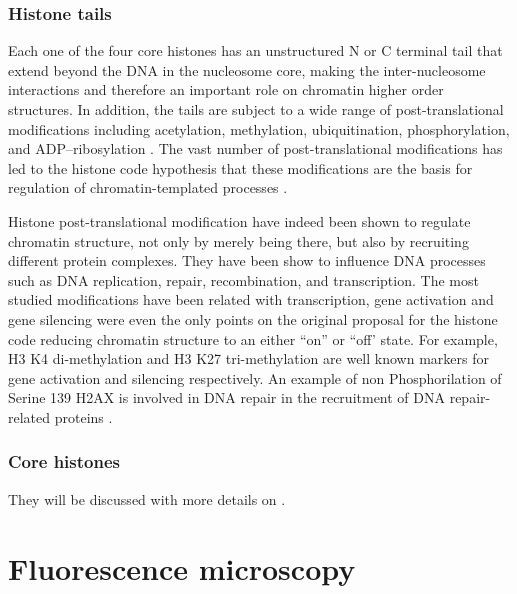    \subsubsection{Histone tails}

      Each one of the four core histones has an unstructured N or C
      terminal tail that extend beyond the DNA in the nucleosome core,
      making the inter-nucleosome interactions and therefore an important
      role on chromatin higher order structures.
      In addition, the tails are subject to a wide range of
      post-translational modifications
      including acetylation, methylation, ubiquitination, phosphorylation,
      and ADP--ribosylation \citep{bannister2011ptm-review}.
      The vast number of post-translational modifications has led to the
      histone code hypothesis that these modifications are the basis for
      regulation of chromatin-templated processes \citep{jenuwein200histone-code}.


      Histone post-translational modification have indeed been shown to
      regulate chromatin structure, not only by merely being there, but
      also by recruiting different protein complexes.
      They have been show to influence
      DNA processes such as DNA replication, repair, recombination,
      and transcription.
      The most studied modifications have been related with transcription,
      gene activation and gene silencing were even the only points
      on the original proposal for the histone code \citep{jenuwein200histone-code}
      reducing chromatin structure to an either ``on'' or ``off' state.
      For example,
      H3 K4 di-methylation and H3 K27 tri-methylation are well known
      markers for gene activation and silencing respectively.
      An example of non
      Phosphorilation of Serine 139 H2AX is involved in DNA repair
      in the recruitment of DNA repair-related proteins .

    \subsubsection{Core histones}
    
      They will be discussed with more details on .


\section{Fluorescence microscopy}

